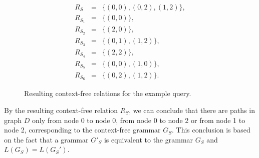 \begin{figure}[h]
\begin{eqnarray*}
R_S&=&\{(0,0),(0,2),(1,2)\},\\
R_{S_1}&=&\{(0,0)\},\\
R_{S_2}&=&\{(2,0)\}, \\
R_{S_3}&=&\{(0,1), (1,2)\}, \\
R_{S_4}&=&\{(2,2)\}, \\
R_{S_5}&=&\{(0,0), (1,0)\}, \\
R_{S_6}&=&\{(0,2), (1,2)\}.
\end{eqnarray*}
\caption{Resulting context-free relations for the example query.}
\label{ExampleQueryCFRelations}
\end{figure}

By the resulting context-free relation $R_S$, we can conclude that there are paths in graph $D$ only from node 0 to node 0, from node 0 to node 2 or from node 1 to node 2, corresponding to the context-free grammar $G_S$. This conclusion is based on the fact that a grammar $G'_S$ is equivalent to the grammar $G_S$ and $L(G_S) = L(G_S')$.